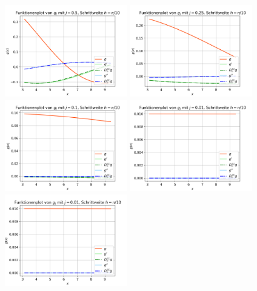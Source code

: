 \documentclass{scrartcl}
\begin{document}
  \includegraphics[width=0.4\textwidth]{Grafiken/Funktionenplot_j05_Pi_Zehntel}
  \includegraphics[width=0.4\textwidth]{Grafiken/Funktionenplot_j025_Pi_Zehntel}
  \includegraphics[width=0.4\textwidth]{Grafiken/Funktionenplot_j01_Pi_Zehntel}
  \includegraphics[width=0.4\textwidth]{Grafiken/Funktionenplot_j001_Pi_Zehntel}
  \includegraphics[width=0.4\textwidth]{Grafiken/Funktionenplot_j001_Pi_Zehntel} \\
\end{document}
